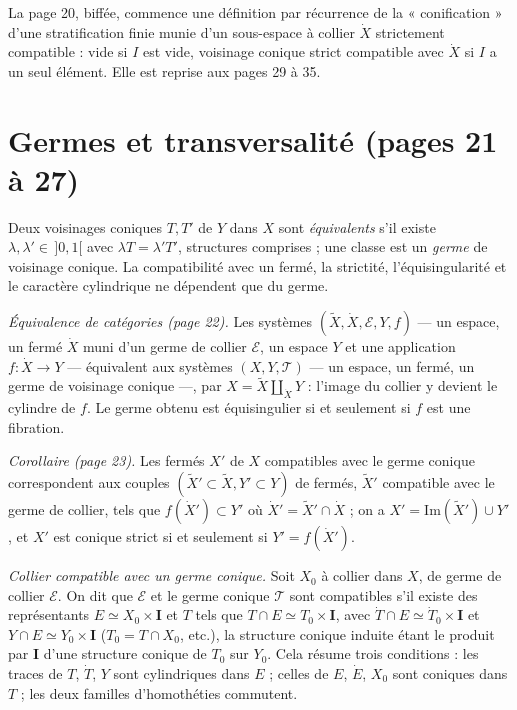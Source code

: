 \documentclass[11pt,a4paper]{article}
\begin{document}
La page 20, biffée, commence une définition par récurrence de la
« conification » d'une stratification finie munie d'un sous-espace à collier
$\dot X$ strictement compatible : vide si $I$ est vide, voisinage conique strict
compatible avec $\dot X$ si $I$ a un seul élément. Elle est reprise aux pages 29
à 35.

\section*{Germes et transversalité (pages 21 à 27)}

Deux voisinages coniques $T, T'$ de $Y$ dans $X$ sont \emph{équivalents} s'il existe
$\lambda, \lambda' \in \,]0,1[$ avec $\lambda T = \lambda' T'$, structures comprises
; une classe est un \emph{germe} de voisinage conique. La compatibilité avec un
fermé, la strictité, l'équisingularité et le caractère cylindrique ne dépendent
que du germe.

\emph{Équivalence de catégories (page 22).} Les systèmes $(\tilde X, \dot X,
\mathcal{E}, Y, f)$ — un espace, un fermé $\dot X$ muni d'un germe de collier
$\mathcal{E}$, un espace $Y$ et une application $f : \dot X \to Y$ — équivalent aux
systèmes $(X, Y, \mathcal{T})$ — un espace, un fermé, un germe de voisinage conique
—, par $X = \tilde X \amalg_{\dot X} Y$ : l'image du collier y devient le cylindre
de $f$. Le germe obtenu est équisingulier si et seulement si $f$ est une fibration.

\emph{Corollaire (page 23).} Les fermés $X'$ de $X$ compatibles avec le germe
conique correspondent aux couples $(\tilde X' \subset \tilde X, Y' \subset Y)$ de
fermés, $\tilde X'$ compatible avec le germe de collier, tels que $f(\dot X')
\subset Y'$ où $\dot X' = \tilde X' \cap \dot X$ ; on a $X' = \mathrm{Im}(\tilde X')
\cup Y'$, et $X'$ est conique strict si et seulement si $Y' = f(\dot X')$.

\emph{Collier compatible avec un germe conique.} Soit $X_0$ à collier dans $X$, de
germe de collier $\mathcal{E}$. On dit que $\mathcal{E}$ et le germe conique
$\mathcal{T}$ sont compatibles s'il existe des représentants $E \simeq X_0 \times
\mathbf{I}$ et $T$ tels que $T \cap E \simeq T_0 \times \mathbf{I}$, avec $\dot T
\cap E \simeq \dot T_0 \times \mathbf{I}$ et $Y \cap E \simeq Y_0 \times \mathbf{I}$
($T_0 = T \cap X_0$, etc.), la structure conique induite étant le produit par
$\mathbf{I}$ d'une structure conique de $T_0$ sur $Y_0$. Cela résume trois
conditions : les traces de $T$, $\dot T$, $Y$ sont cylindriques dans $E$ ; celles de
$E$, $\dot E$, $X_0$ sont coniques dans $T$ ; les deux familles d'homothéties
commutent.
\end{document}
